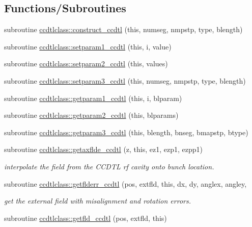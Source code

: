 \subsection*{Functions/\+Subroutines}
\begin{DoxyCompactItemize}
\item 
subroutine \mbox{\hyperlink{namespaceccdtlclass_aaa94d8179c6d59c2d3e81b64e8237962}{ccdtlclass\+::construct\+\_\+ccdtl}} (this, numseg, nmpstp, type, blength)
\item 
subroutine \mbox{\hyperlink{namespaceccdtlclass_adedaabef796136ab3b22dcc923243cfd}{ccdtlclass\+::setparam1\+\_\+ccdtl}} (this, i, value)
\item 
subroutine \mbox{\hyperlink{namespaceccdtlclass_aa32b5665906eac3911db6712a5710f97}{ccdtlclass\+::setparam2\+\_\+ccdtl}} (this, values)
\item 
subroutine \mbox{\hyperlink{namespaceccdtlclass_a3632b0f42925964cedb7778792da563f}{ccdtlclass\+::setparam3\+\_\+ccdtl}} (this, numseg, nmpstp, type, blength)
\item 
subroutine \mbox{\hyperlink{namespaceccdtlclass_a027b988ab66d8b89dabf46f5e45d82f5}{ccdtlclass\+::getparam1\+\_\+ccdtl}} (this, i, blparam)
\item 
subroutine \mbox{\hyperlink{namespaceccdtlclass_a8455f87d9ac20671adf737902c8b90d8}{ccdtlclass\+::getparam2\+\_\+ccdtl}} (this, blparams)
\item 
subroutine \mbox{\hyperlink{namespaceccdtlclass_a529631343d4306c6c486d72e2a6696a3}{ccdtlclass\+::getparam3\+\_\+ccdtl}} (this, blength, bnseg, bmapstp, btype)
\item 
subroutine \mbox{\hyperlink{namespaceccdtlclass_adb7b1c30d3fcb087a5064911ccd4fd1d}{ccdtlclass\+::getaxflde\+\_\+ccdtl}} (z, this, ez1, ezp1, ezpp1)
\begin{DoxyCompactList}\small\item\em interpolate the field from the C\+C\+D\+TL rf cavity onto bunch location. \end{DoxyCompactList}\item 
subroutine \mbox{\hyperlink{namespaceccdtlclass_ab81d1b262943e405eebe3bfef401bb97}{ccdtlclass\+::getflderr\+\_\+ccdtl}} (pos, extfld, this, dx, dy, anglex, angley,
\begin{DoxyCompactList}\small\item\em get the external field with misalignment and rotation errors. \end{DoxyCompactList}\item 
subroutine \mbox{\hyperlink{namespaceccdtlclass_a62eb43f6a732d52951d468e91a2312cb}{ccdtlclass\+::getfld\+\_\+ccdtl}} (pos, extfld, this)

\end{DoxyCompactItemize}
